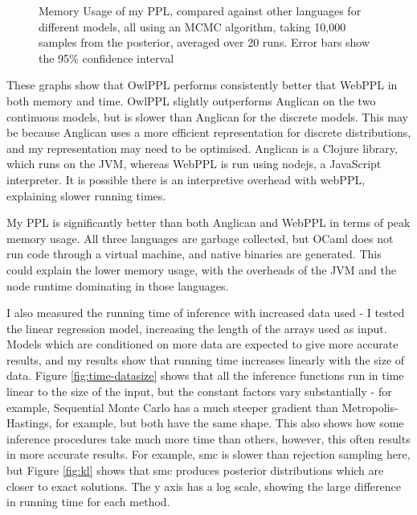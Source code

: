 \begin{figure}[!ht]
	\centering
	
	\caption{Memory Usage of my PPL, compared against other languages for different models, all using an MCMC algorithm, taking 10,000 samples from the posterior, averaged over 20 runs. Error bars show the 95\% confidence interval}
	\label{fig:mem-perf}
\end{figure}
				
These graphs show that OwlPPL performs consistently better that WebPPL in both memory and time. OwlPPL slightly outperforms Anglican on the two continuous models, but is slower than Anglican for the discrete models. This may be because Anglican uses a more efficient representation for discrete distributions, and my representation may need to be optimised. Anglican is a Clojure library, which runs on the JVM, whereas WebPPL is run using nodejs, a JavaScript interpreter. It is possible there is an interpretive overhead with webPPL, explaining slower running times. 
				
My PPL is significantly better than both Anglican and WebPPL in terms of peak memory usage. All three languages are garbage collected, but OCaml does not run code through a virtual machine, and native binaries are generated. This could explain the lower memory usage, with the overheads of the JVM and the node runtime dominating in those languages.
				
				
I also measured the running time of inference with increased data used - I tested the linear regression model, increasing the length of the arrays used as input. Models which are conditioned on more data are expected to give more accurate results, and my results show that running time increases linearly with the size of data. Figure \ref{fig:time-datasize} shows that all the inference functions run in time linear to the size of the input, but the constant factors vary substantially - for example, Sequential Monte Carlo has a much steeper gradient than Metropolis-Hastings, for example, but both have the same shape. This also shows how some inference procedures take much more time than others, however, this often results in more accurate results. For example, smc is slower than rejection sampling here, but Figure \ref{fig:kl} shows that smc produces posterior distributions which are closer to exact solutions. The y axis has a log scale, showing the large difference in running time for each method.
				
